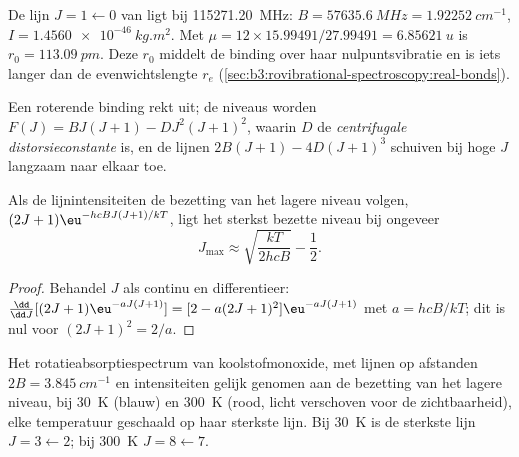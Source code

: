\begin{example}[Koolstofmonoxide]\label{ex:b3:rovibrational-spectroscopy:co}
De lijn $J = 1 \leftarrow 0$ van  ligt bij \qty{115271.20}{MHz}:
$B = \qty{57635.6}{MHz} = \qty{1.92252}{cm^{-1}}$, $I = \qty{1.4560e-46}{kg.m^2}$.
Met $\mu = 12 \times 15.99491/27.99491 = \qty{6.85621}{u}$ is $r_0 = \qty{113.09}{pm}$.
Deze $r_0$ middelt de binding over haar nulpuntsvibratie en is iets langer
dan de evenwichtslengte $r_e$ (\cref{sec:b3:rovibrational-spectroscopy:real-bonds}).
\end{example}

\begin{definition}\label{def:b3:rovibrational-spectroscopy:centrifugal}
Een roterende binding rekt uit; de niveaus worden $F(J) = BJ(J+1) - DJ^2(J+1)^2$,
waarin $D$ de \emph{centrifugale distorsieconstante}
is, en de lijnen $2B(J+1) - 4D(J+1)^3$ schuiven bij hoge $J$ langzaam naar
elkaar toe.
\end{definition}

\begin{proposition}\label{prop:b3:rovibrational-spectroscopy:jmax}
Als de lijnintensiteiten de bezetting van het lagere niveau volgen, $(2J+1)
\eu^{-hcBJ(J+1)/kT}$, ligt het sterkst bezette niveau bij ongeveer
\[
J_{\max} \approx \sqrt{\frac{kT}{2hcB}} - \frac12.
\]
\end{proposition}

\begin{proof}
Behandel $J$ als continu en differentieer: $\frac{\dd}{\dd J}[(2J+1)\eu^{-aJ(J+1)}]
= [2 - a(2J+1)^2]\eu^{-aJ(J+1)}$ met $a = hcB/kT$; dit is nul voor $(2J + 1)^2 =
2/a$.
\end{proof}

\begin{omfigure}

{\small Het rotatieabsorptiespectrum van koolstofmonoxide, met lijnen op
afstanden $2B = \qty{3.845}{cm^{-1}}$ en intensiteiten gelijk genomen aan
de bezetting van het lagere niveau, bij \qty{30}{K} (blauw) en \qty{300}{K}
(rood, licht verschoven voor de zichtbaarheid), elke temperatuur
geschaald op haar sterkste lijn. Bij \qty{30}{K} is de sterkste lijn
$J = 3 \leftarrow 2$; bij \qty{300}{K} $J = 8 \leftarrow 7$.}
\end{omfigure}

